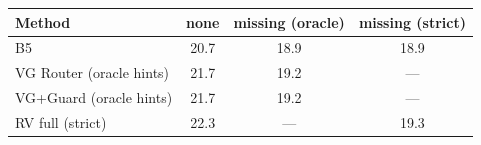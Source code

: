 \begin{tabular}{lccc}
\toprule
Method & none & missing (oracle) & missing (strict) \\
\midrule
B5 & 20.7 & 18.9 & 18.9 \\
VG Router (oracle hints) & 21.7 & 19.2 & --- \\
VG+Guard (oracle hints) & 21.7 & 19.2 & --- \\
RV full (strict) & 22.3 & --- & 19.3 \\
\bottomrule
\end{tabular}
